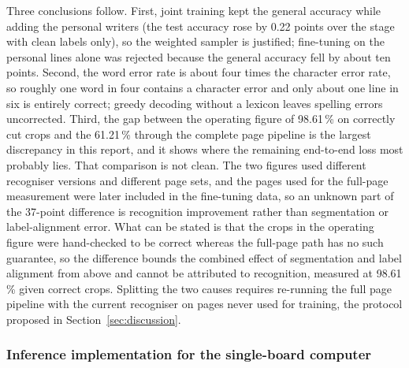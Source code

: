 Three conclusions follow.
First, joint training kept the general accuracy while adding the personal writers (the test accuracy rose by 0.22 points over the stage with clean labels only), so the weighted sampler is justified; fine-tuning on the personal lines alone was rejected because the general accuracy fell by about ten points.
Second, the word error rate is about four times the character error rate, so roughly one word in four contains a character error and only about one line in six is entirely correct; greedy decoding without a lexicon leaves spelling errors uncorrected.
Third, the gap between the operating figure of 98.61\,\% on correctly cut crops and the 61.21\,\% through the complete page pipeline is the largest discrepancy in this report, and it shows where the remaining end-to-end loss most probably lies.
That comparison is not clean.
The two figures used different recogniser versions and different page sets, and the pages used for the full-page measurement were later included in the fine-tuning data, so an unknown part of the 37-point difference is recognition improvement rather than segmentation or label-alignment error.
What can be stated is that the crops in the operating figure were hand-checked to be correct whereas the full-page path has no such guarantee, so the difference bounds the combined effect of segmentation and label alignment from above and cannot be attributed to recognition, measured at 98.61\,\% given correct crops.
Splitting the two causes requires re-running the full page pipeline with the current recogniser on pages never used for training, the protocol proposed in Section~\ref{sec:discussion}.

\subsubsection{Inference implementation for the single-board computer}

